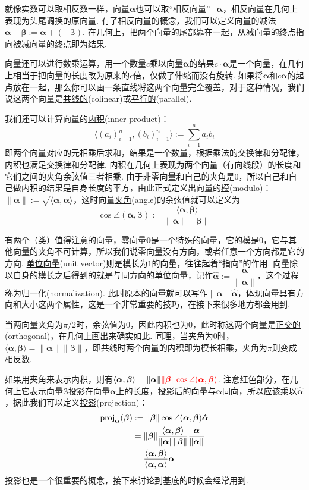 \documentclass[main.tex]{subfiles}
\begin{document}
就像实数可以取相反数一样，向量\(\bm{\alpha}\)也可以取“相反向量”\(-\bm{\alpha}\)，相反向量在几何上表现为头尾调换的原向量. 有了相反向量的概念，我们可以定义向量的减法\(\bm{\alpha} - \bm{\beta} := \bm{\alpha} + (-\bm{\beta})\). 在几何上，把两个向量的尾部靠在一起，从减向量的终点指向被减向量的终点即为结果.

向量还可以进行数乘运算，用一个数量\(c\)乘以向量\(\bm{\alpha}\)的结果\(c \cdot \bm{\alpha}\)是一个向量，在几何上相当于把向量的长度改为原来的\(c\)倍，仅做了伸缩而没有旋转. 如果将\(\bm{\alpha}\)和\(c\bm{\alpha}\)的起点放在一起，那么你可以画一条直线将这两个向量完全覆盖，对于这种情况，我们说这两个向量是\uline{共线的}(colinear)或\uline{平行的}(parallel).

我们还可以计算向量的\uline{内积}(inner product)：
\[\langle (a_i)_{i=1}^n, (b_i)_{i=1}^n \rangle := \sum_{i=1}^{n}a_ib_i\]
即两个向量对应的元相乘后求和，结果是一个数量，根据乘法的交换律和分配律，内积也满足交换律和分配律. 内积在几何上表现为两个向量（有向线段）的长度和它们之间的夹角余弦值三者相乘. 由于非零向量和自己的夹角是\(0\)，所以自己和自己做内积的结果是自身长度的平方，由此正式定义出向量的\uline{模}(modulo)：\(\|\bm{\alpha}\| := \sqrt{\langle \bm{\alpha},\bm{\alpha}\rangle}\)，这时向量\uline{夹角}(angle)的余弦值就可以定义为
\[\cos\angle(\bm{\alpha},\bm{\beta}) := \frac{\langle \bm{\alpha},\bm{\beta} \rangle}{\|\bm{\alpha}\|\|\bm{\beta}\|}\]

有两个（类）值得注意的向量，零向量\(\bm{0}\)是一个特殊的向量，它的模是\(0\)，它与其他向量的夹角不可计算，所以我们说零向量没有方向，或者任意一个方向都是它的方向. \uline{单位向量}(unit vector)则是模长为\(1\)的向量，往往起着“指向”的作用. 向量除以自身的模长之后得到的就是与同方向的单位向量，记作\(\bm{\hat{\alpha}} := \dfrac{\bm{\alpha}}{\|\bm{\alpha}\|}\)，这个过程称为\uline{归一化}(normalization). 此时原本的向量就可以写作\(\|\bm{\alpha}\|\bm{\hat{\alpha}}\)，体现向量具有方向和大小这两个属性，这是一个非常重要的技巧，在接下来很多地方都会用到.

当两向量夹角为\(\pi/2\)时，余弦值为\(0\)，因此内积也为\(0\)，此时称这两个向量是\uline{正交的}(orthogonal)，在几何上画出来确实如此. 同理，当夹角为\(0\)时，\(\langle \bm{\alpha},\bm{\beta}\rangle = \|\bm{\alpha}\|\|\bm{\beta}\|\)，即共线时两个向量的内积即为模长相乘，夹角为\(\pi\)则变成相反数. 

如果用夹角来表示内积，则有\(\langle \bm{\alpha},\bm{\beta} \rangle = \|\bm{\alpha}\|{\color{red}\|\bm{\beta}\|\cos\angle(\bm{\alpha},\bm{\beta})}\). 注意红色部分，在几何上它表示向量\(\bm{\beta}\)投影在向量\(\bm{\alpha}\)上的长度，投影后的向量与\(\bm{\alpha}\)同向，所以应该乘以\(\bm{\hat{\alpha}}\)，据此我们可以定义\uline{投影}(projection)：
\[
    \begin{aligned}
        {\rm proj}_{\bm{\alpha}}(\bm{\beta}) &:= \|\bm{\beta}\|\cos\angle(\bm{\alpha},\bm{\beta})\bm{\hat{\alpha}} \\
        & = \|\bm{\beta}\|\frac{\langle \bm{\alpha},\bm{\beta} \rangle}{\|\bm{\alpha}\|\|\bm{\beta}\|}\frac{\bm{\alpha}}{\|\bm{\alpha}\|} \\
        & = \frac{\langle\bm{\alpha},\bm{\beta}\rangle}{\langle\bm{\alpha},\bm{\alpha}\rangle}\bm{\alpha}
    \end{aligned}
\]
投影也是一个很重要的概念，接下来讨论到基底的时候会经常用到. 
\end{document}
